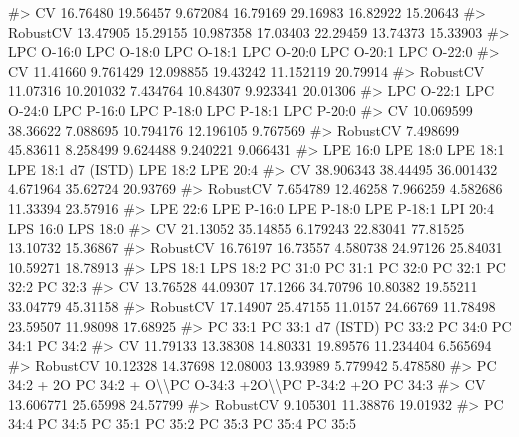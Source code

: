 \documentclass[
  letterpaper,
  DIV=11,
  numbers=noendperiod]{scrreprt}
\newenvironment{Shaded}{\begin{snugshade}}{\end{snugshade}}
\newcommand{\CommentTok}[1]{\textcolor[rgb]{0.37,0.37,0.37}{#1}}
\begin{document}
\begin{Shaded}
\begin{Highlighting}[]
\CommentTok{\#\textgreater{} CV       16.76480 19.56457  9.672084 16.79169 29.16983 16.82922 15.20643}
\CommentTok{\#\textgreater{} RobustCV 13.47905 15.29155 10.987358 17.03403 22.29459 13.74373 15.33903}
\CommentTok{\#\textgreater{}          LPC O{-}16:0 LPC O{-}18:0 LPC O{-}18:1 LPC O{-}20:0 LPC O{-}20:1 LPC O{-}22:0}
\CommentTok{\#\textgreater{} CV         11.41660   9.761429  12.098855   19.43242  11.152119   20.79914}
\CommentTok{\#\textgreater{} RobustCV   11.07316  10.201032   7.434764   10.84307   9.923341   20.01306}
\CommentTok{\#\textgreater{}          LPC O{-}22:1 LPC O{-}24:0 LPC P{-}16:0 LPC P{-}18:0 LPC P{-}18:1 LPC P{-}20:0}
\CommentTok{\#\textgreater{} CV        10.069599   38.36622   7.088695  10.794176  12.196105   9.767569}
\CommentTok{\#\textgreater{} RobustCV   7.498699   45.83611   8.258499   9.624488   9.240221   9.066431}
\CommentTok{\#\textgreater{}           LPE 16:0 LPE 18:0  LPE 18:1 LPE 18:1 d7 (ISTD) LPE 18:2 LPE 20:4}
\CommentTok{\#\textgreater{} CV       38.906343 38.44495 36.001432           4.671964 35.62724 20.93769}
\CommentTok{\#\textgreater{} RobustCV  7.654789 12.46258  7.966259           4.582686 11.33394 23.57916}
\CommentTok{\#\textgreater{}          LPE 22:6 LPE P{-}16:0 LPE P{-}18:0 LPE P{-}18:1 LPI 20:4 LPS 16:0 LPS 18:0}
\CommentTok{\#\textgreater{} CV       21.13052   35.14855   6.179243   22.83041 77.81525 13.10732 15.36867}
\CommentTok{\#\textgreater{} RobustCV 16.76197   16.73557   4.580738   24.97126 25.84031 10.59271 18.78913}
\CommentTok{\#\textgreater{}          LPS 18:1 LPS 18:2 PC 31:0  PC 31:1  PC 32:0  PC 32:1  PC 32:2  PC 32:3}
\CommentTok{\#\textgreater{} CV       13.76528 44.09307 17.1266 34.70796 10.80382 19.55211 33.04779 45.31158}
\CommentTok{\#\textgreater{} RobustCV 17.14907 25.47155 11.0157 24.66769 11.78498 23.59507 11.98098 17.68925}
\CommentTok{\#\textgreater{}           PC 33:1 PC 33:1 d7 (ISTD)  PC 33:2  PC 34:0   PC 34:1  PC 34:2}
\CommentTok{\#\textgreater{} CV       11.79133          13.38308 14.80331 19.89576 11.234404 6.565694}
\CommentTok{\#\textgreater{} RobustCV 10.12328          14.37698 12.08003 13.93989  5.779942 5.478580}
\CommentTok{\#\textgreater{}          PC 34:2 + 2O PC 34:2 + O\textbackslash{}\textbackslash{}PC O{-}34:3 +2O\textbackslash{}\textbackslash{}PC P{-}34:2 +2O  PC 34:3}
\CommentTok{\#\textgreater{} CV          13.606771                                  25.65998 24.57799}
\CommentTok{\#\textgreater{} RobustCV     9.105301                                  11.38876 19.01932}
\CommentTok{\#\textgreater{}           PC 34:4  PC 34:5  PC 35:1  PC 35:2  PC 35:3  PC 35:4  PC 35:5}

\end{Highlighting}
\end{Shaded}
\end{document}
